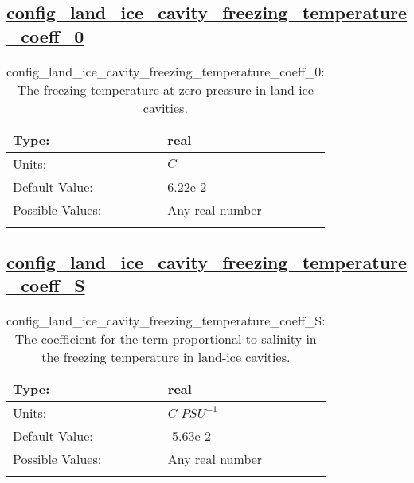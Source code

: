 \subsection[config\_land\_ice\_cavity\_freezing\_temperature\_coeff\_0]{\hyperref[sec:nm_tab_eos]{config\_land\_ice\_cavity\_freezing\_temperature\_coeff\_0}}
\label{subsec:nm_sec_config_land_ice_cavity_freezing_temperature_coeff_0}
\begin{center}
\begin{longtable}{| p{2.0in} || p{4.0in} |}
    \hline
    Type: & real \\
    \hline
    Units: & $C$ \\
    \hline
    Default Value: & 6.22e-2 \\
    \hline
    Possible Values: & Any real number \\
    \hline
    \caption{config\_land\_ice\_cavity\_freezing\_temperature\_coeff\_0: The freezing temperature at zero pressure in land-ice cavities.}
\end{longtable}
\end{center}
\subsection[config\_land\_ice\_cavity\_freezing\_temperature\_coeff\_S]{\hyperref[sec:nm_tab_eos]{config\_land\_ice\_cavity\_freezing\_temperature\_coeff\_S}}
\label{subsec:nm_sec_config_land_ice_cavity_freezing_temperature_coeff_S}
\begin{center}
\begin{longtable}{| p{2.0in} || p{4.0in} |}
    \hline
    Type: & real \\
    \hline
    Units: & $C$ $PSU^{-1}$ \\
    \hline
    Default Value: & -5.63e-2 \\
    \hline
    Possible Values: & Any real number \\
    \hline
    \caption{config\_land\_ice\_cavity\_freezing\_temperature\_coeff\_S: The coefficient for the term proportional to salinity in the freezing temperature in land-ice cavities.}
\end{longtable}
\end{center}
